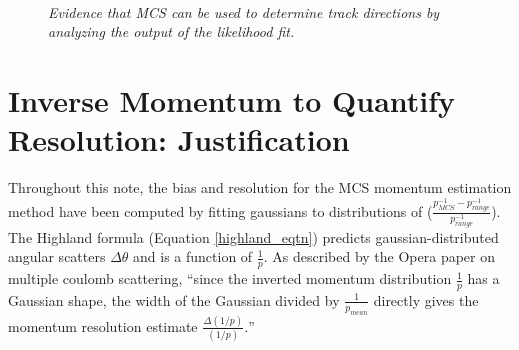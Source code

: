 \begin{figure}
\centering
\mbox{
	\quad
	}
\caption{\textit{Evidence that MCS can be used to determine track directions by analyzing the output of the likelihood fit.}}
\end{figure}

\section{Inverse Momentum to Quantify Resolution: Justification}\label{inverse_p_justification_section}
Throughout this note, the bias and resolution for the MCS momentum estimation method have been computed by fitting gaussians to distributions of ($\frac{p_{MCS}^{-1} - p_{range}^{-1}}{p_{range}^{-1}}$). The Highland formula (Equation \ref{highland_eqtn}) predicts gaussian-distributed angular scatters $\Delta\theta$ and is a function of $\frac{1}{p}$. As described by the Opera paper on multiple coulomb scattering\cite{OPERApaper}, ``since the inverted momentum distribution $\frac{1}{p}$ has a Gaussian shape, the width of the Gaussian divided by $\frac{1}{p_{mean}}$ directly gives the momentum resolution estimate $\frac{\Delta(1/p)}{(1/p)}.$''

